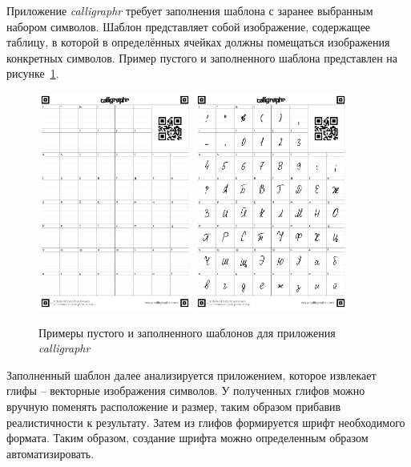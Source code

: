 Приложение \textit{calligraphr} требует заполнения шаблона с заранее выбранным набором символов.
Шаблон представляет собой изображение, содержащее таблицу, в которой в определённых ячейках должны помещаться изображения конкретных символов.
Пример пустого и заполненного шаблона представлен на рисунке~\ref{fig:templates}.

\begin{figure}[h!]
    \centering
    \includegraphics[width=0.45\textwidth]{img/template}
    \includegraphics[width=0.45\textwidth]{img/template_filled}
    \caption{Примеры пустого и заполненного шаблонов для приложения \textit{calligraphr}}
    \label{fig:templates}
\end{figure}

Заполненный шаблон далее анализируется приложением, которое извлекает глифы -- векторные изображения символов.
У полученных глифов можно вручную поменять расположение и размер, таким образом прибавив реалистичности к результату.
Затем из глифов формируется шрифт необходимого формата.
Таким образом, создание шрифта можно определенным образом автоматизировать.

